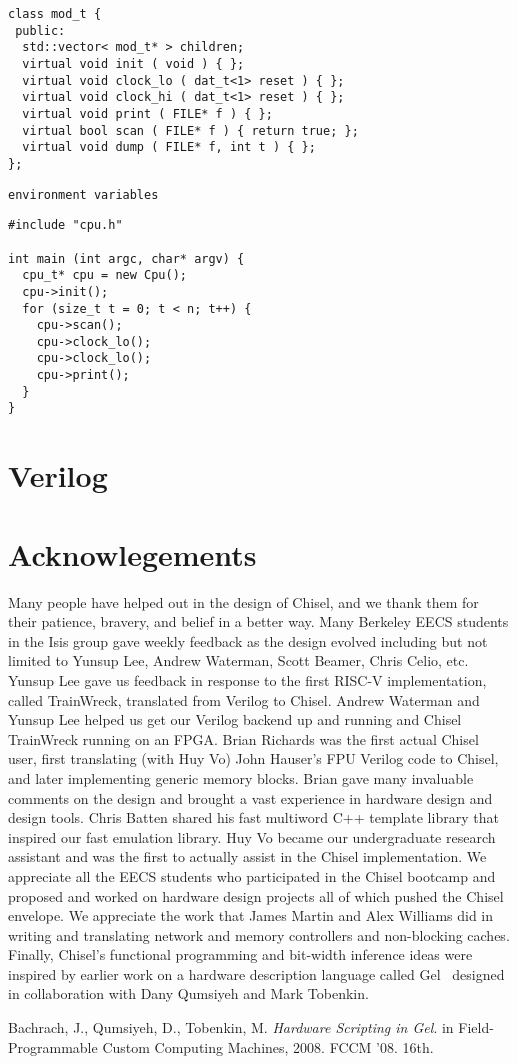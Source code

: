 \documentclass[10pt,twocolumn]{article}
\def\note#1{\noindent{\bf [Note: #1]}}
\begin{document}
\begin{verbatim}
class mod_t {
 public:
  std::vector< mod_t* > children;
  virtual void init ( void ) { };
  virtual void clock_lo ( dat_t<1> reset ) { };
  virtual void clock_hi ( dat_t<1> reset ) { };
  virtual void print ( FILE* f ) { };
  virtual bool scan ( FILE* f ) { return true; };
  virtual void dump ( FILE* f, int t ) { };
};
\end{verbatim}

\begin{verbatim}
environment variables
\end{verbatim}

\begin{verbatim}
#include "cpu.h"

int main (int argc, char* argv) {
  cpu_t* cpu = new Cpu();  
  cpu->init();
  for (size_t t = 0; t < n; t++) {
    cpu->scan();
    cpu->clock_lo();
    cpu->clock_lo();
    cpu->print();
  }
}
\end{verbatim}

\section{Verilog}

\section{Acknowlegements}

Many people have helped out in the design of Chisel, and we thank them
for their patience, bravery, and belief in a better way.  Many
Berkeley EECS students in the Isis group gave weekly feedback as the
design evolved including but not limited to Yunsup Lee, Andrew
Waterman, Scott Beamer, Chris Celio, etc.  Yunsup Lee gave us feedback
in response to the first RISC-V implementation, called TrainWreck,
translated from Verilog to Chisel.  Andrew Waterman and Yunsup Lee
helped us get our Verilog backend up and running and Chisel TrainWreck
running on an FPGA.  Brian Richards was the first actual Chisel user,
first translating (with Huy Vo) John Hauser's FPU Verilog code to
Chisel, and later implementing generic memory blocks.  Brian gave many
invaluable comments on the design and brought a vast experience in
hardware design and design tools.  Chris Batten shared his fast
multiword C++ template library that inspired our fast emulation
library.  Huy Vo became our undergraduate research assistant and was
the first to actually assist in the Chisel implementation.  We
appreciate all the EECS students who participated in the Chisel
bootcamp and proposed and worked on hardware design projects all of
which pushed the Chisel envelope.  We appreciate the work that James
Martin and Alex Williams did in writing and translating network and
memory controllers and non-blocking caches.  Finally, Chisel's
functional programming and bit-width inference ideas were inspired by
earlier work on a hardware description language called Gel~\cite{gel} designed in
collaboration with Dany Qumsiyeh and Mark Tobenkin.


\begin{thebibliography}{50}
 Bachrach, J., Qumsiyeh, D., Tobenkin, M. \textsl{Hardware Scripting in Gel}.
in Field-Programmable Custom Computing Machines, 2008. FCCM '08. 16th.
\end{thebibliography}
\end{document}

